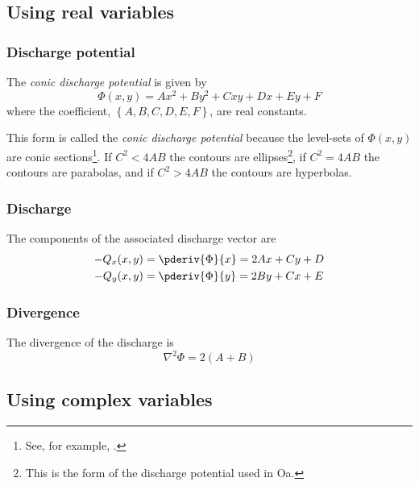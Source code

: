 \documentclass[12pt]{article}
\newcommand{\Oneka}{{\textsf{O\raisebox{-0.3ex}{n}\raisebox{0.3ex}{e}\raisebox{-0.3ex}{k}a}}}
\begin{document}
\subsection{Using real variables}
\subsubsection{Discharge potential}
The {\em conic discharge potential} is given by
%
\begin{equation} \label{7.2}
\boxed{
    \Phi(x,y) = Ax^2 + By^2 + Cxy + Dx + Ey + F
}
\end{equation}
%
where the coefficient, $\left\{ A, B, C, D, E, F \right\}$, are real constants.

This form is called the {\em conic discharge potential} because the level-sets of $\Phi(x,y)$ are conic sections\footnote{See, for example, \citet{wiki:conic}.}.  If $C^2 < 4AB$ the contours are ellipses\footnote{This is the form of the discharge potential used in {\Oneka}.}, if $C^2 = 4AB$ the contours are parabolas, and if $C^2 > 4AB$ the contours are hyperbolas.

\subsubsection{Discharge}
The components of the associated discharge vector are
%
\begin{align}
    -Q_x(x,y) &= \pderiv{\Phi}{x} = 2Ax + Cy + D \label{7.3}\\
    -Q_y(x,y) &= \pderiv{\Phi}{y} = 2By + Cx + E \label{7.4}
\end{align}

\subsubsection{Divergence}
The divergence of the discharge is
%
\begin{equation}\label{7.5}
    \nabla^2 \Phi = 2(A+B)
\end{equation}

\subsection{Using complex variables}
\end{document}
